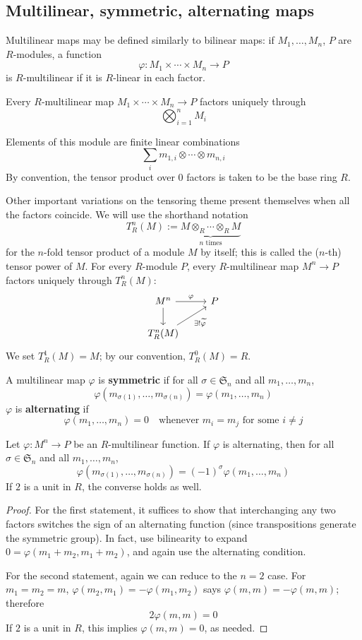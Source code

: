 \subsection{Multilinear, symmetric, alternating maps}
Multilinear maps may be defined similarly to bilinear maps: if $M_1,\dots,M_n$, $P$ are $R$-modules, a function
\[\varphi:M_1\times\cdots\times M_n\to P\]
is $R$-multilinear if it is $R$-linear in each factor.
\begin{claim}
Every $R$-multilinear map $M_1\times\cdots\times M_n\to P$ factors uniquely through
\[\bigotimes_{i=1}^{n}M_i\]
\end{claim}
Elements of this module are finite linear combinations
\[\sum_im_{1,i}\otimes\cdots\otimes m_{n,i}\]
By convention, the tensor product over $0$ factors is taken to be the base ring $R$.\par
Other important variations on the tensoring theme present themselves when all the factors coincide. We will use the shorthand notation
\[T_R^{n}(M):=\underbrace{M\otimes_{R}\cdots\otimes_{R}M}_\text{$n$ times}\]
for the $n$-fold tensor product of a module $M$ by itself; this is called the ($n$-th) tensor
power of $M$. For every $R$-module $P$, every $R$-multilinear map $M^{n}\to P$ factors uniquely through $T_R^{n}(M)$:
\[\begin{tikzcd}
M^n\ar[d]\ar[r,"\varphi"]&P\\
T_R^{n}(M)\ar[ru,swap,"\exists !\widetilde{\varphi}"]
\end{tikzcd}\]
We set $T_R^{1}(M)=M$; by our convention, $T_R^{0}(M)=R$.
\begin{definition}
A multilinear map $\varphi$ is \textbf{symmetric} if for all $\sigma\in\mathfrak{S}_{n}$ and all $m_1,\dots,m_n$, 
\[\varphi(m_{\sigma(1)},\dots,m_{\sigma(n)})=\varphi(m_1,\dots,m_n)\]
$\varphi$ is \textbf{alternating} if
\[\varphi(m_1,\dots,m_n)=0\quad\text{whenever $m_i=m_j$ for some $i\neq j$}\]
\end{definition}
\begin{lemma}
Let $\varphi:M^n\to P$ be an $R$-multilinear function. If $\varphi$ is alternating, then for all $\sigma\in\mathfrak{S}_n$ and all $m_1,\dots,m_n$,
\[\varphi(m_{\sigma(1)},\dots,m_{\sigma(n)})=(-1)^\sigma\varphi(m_1,\dots,m_n)\]
If $2$ is a unit in $R$, the converse holds as well.
\end{lemma}
\begin{proof}
For the first statement, it suffices to show that interchanging any two factors switches the sign of an alternating function (since transpositions generate the symmetric group). In fact, use bilinearity to expand $0=\varphi(m_1+m_2,m_1+m_2)$, and again use the alternating condition.\par
For the second statement, again we can reduce to the $n=2$ case. For $m_1=m_2=m$, $\varphi(m_2,m_1)=-\varphi(m_1,m_2)$ says $\varphi(m,m)=-\varphi(m,m)$; therefore
\[2\varphi(m,m)=0\]
If $2$ is a unit in $R$, this implies $\varphi(m,m)=0$, as needed.
\end{proof}
